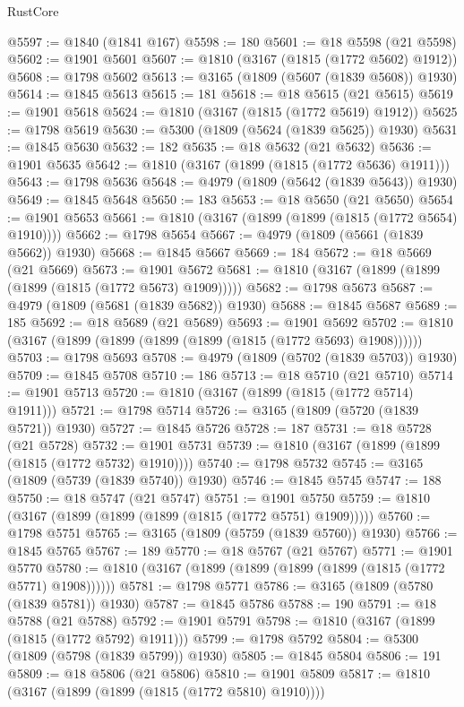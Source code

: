 \begin{lexlean}{RustCore}
\begin{coremodule}
@5597 := @1840 (@1841 @167)
@5598 := 180
@5601 := @18 @5598 (@21 @5598)
@5602 := @1901 @5601
@5607 := @1810 (@3167 (@1815 (@1772 @5602) @1912))
@5608 := @1798 @5602
@5613 := @3165 (@1809 (@5607 (@1839 @5608)) @1930)
@5614 := @1845 @5613
@5615 := 181
@5618 := @18 @5615 (@21 @5615)
@5619 := @1901 @5618
@5624 := @1810 (@3167 (@1815 (@1772 @5619) @1912))
@5625 := @1798 @5619
@5630 := @5300 (@1809 (@5624 (@1839 @5625)) @1930)
@5631 := @1845 @5630
@5632 := 182
@5635 := @18 @5632 (@21 @5632)
@5636 := @1901 @5635
@5642 := @1810 (@3167 (@1899 (@1815 (@1772 @5636) @1911)))
@5643 := @1798 @5636
@5648 := @4979 (@1809 (@5642 (@1839 @5643)) @1930)
@5649 := @1845 @5648
@5650 := 183
@5653 := @18 @5650 (@21 @5650)
@5654 := @1901 @5653
@5661 := @1810 (@3167 (@1899 (@1899 (@1815 (@1772 @5654) @1910))))
@5662 := @1798 @5654
@5667 := @4979 (@1809 (@5661 (@1839 @5662)) @1930)
@5668 := @1845 @5667
@5669 := 184
@5672 := @18 @5669 (@21 @5669)
@5673 := @1901 @5672
@5681 := @1810 (@3167 (@1899 (@1899 (@1899 (@1815 (@1772 @5673) @1909)))))
@5682 := @1798 @5673
@5687 := @4979 (@1809 (@5681 (@1839 @5682)) @1930)
@5688 := @1845 @5687
@5689 := 185
@5692 := @18 @5689 (@21 @5689)
@5693 := @1901 @5692
@5702 := @1810 (@3167 (@1899 (@1899 (@1899 (@1899 (@1815 (@1772 @5693) @1908))))))
@5703 := @1798 @5693
@5708 := @4979 (@1809 (@5702 (@1839 @5703)) @1930)
@5709 := @1845 @5708
@5710 := 186
@5713 := @18 @5710 (@21 @5710)
@5714 := @1901 @5713
@5720 := @1810 (@3167 (@1899 (@1815 (@1772 @5714) @1911)))
@5721 := @1798 @5714
@5726 := @3165 (@1809 (@5720 (@1839 @5721)) @1930)
@5727 := @1845 @5726
@5728 := 187
@5731 := @18 @5728 (@21 @5728)
@5732 := @1901 @5731
@5739 := @1810 (@3167 (@1899 (@1899 (@1815 (@1772 @5732) @1910))))
@5740 := @1798 @5732
@5745 := @3165 (@1809 (@5739 (@1839 @5740)) @1930)
@5746 := @1845 @5745
@5747 := 188
@5750 := @18 @5747 (@21 @5747)
@5751 := @1901 @5750
@5759 := @1810 (@3167 (@1899 (@1899 (@1899 (@1815 (@1772 @5751) @1909)))))
@5760 := @1798 @5751
@5765 := @3165 (@1809 (@5759 (@1839 @5760)) @1930)
@5766 := @1845 @5765
@5767 := 189
@5770 := @18 @5767 (@21 @5767)
@5771 := @1901 @5770
@5780 := @1810 (@3167 (@1899 (@1899 (@1899 (@1899 (@1815 (@1772 @5771) @1908))))))
@5781 := @1798 @5771
@5786 := @3165 (@1809 (@5780 (@1839 @5781)) @1930)
@5787 := @1845 @5786
@5788 := 190
@5791 := @18 @5788 (@21 @5788)
@5792 := @1901 @5791
@5798 := @1810 (@3167 (@1899 (@1815 (@1772 @5792) @1911)))
@5799 := @1798 @5792
@5804 := @5300 (@1809 (@5798 (@1839 @5799)) @1930)
@5805 := @1845 @5804
@5806 := 191
@5809 := @18 @5806 (@21 @5806)
@5810 := @1901 @5809
@5817 := @1810 (@3167 (@1899 (@1899 (@1815 (@1772 @5810) @1910))))

\end{coremodule}
\end{lexlean}
